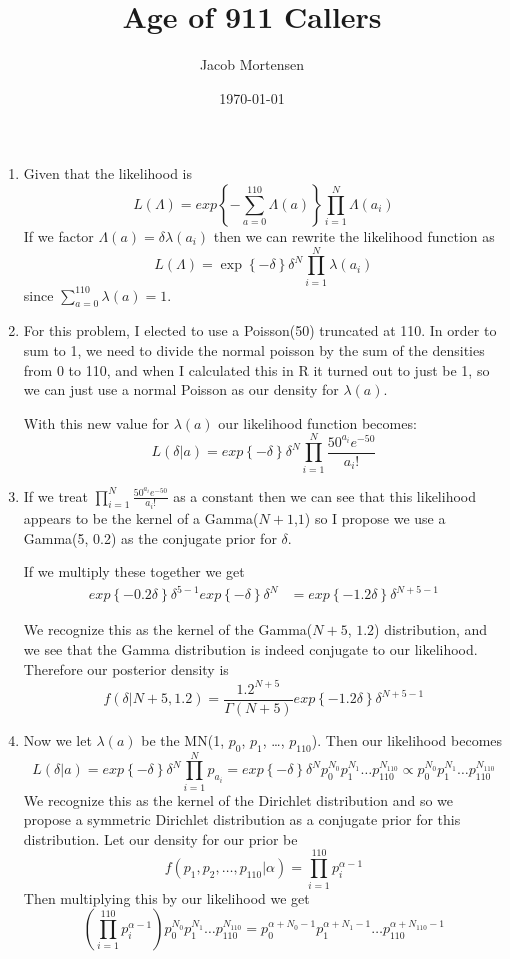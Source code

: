 \documentclass[12pt, oneside]{article}
\title{Age of 911 Callers}
\author{Jacob Mortensen}
\date{\today}
\begin{document}
\maketitle
\begin{enumerate}

\item Given that the likelihood is 
$$L(\Lambda) = exp\left\{-\sum_{a=0}^{110}\Lambda(a)\right\}\prod_{i=1}^{N}\Lambda(a_i)$$
If we factor $\Lambda(a) = \delta \lambda(a_i)$ then we can rewrite the likelihood function as
$$ L(\Lambda) = \exp\left\{-\delta\right\}\delta^N\prod_{i=1}^{N}\lambda(a_i)$$
since $\sum_{a=0}^{110}\lambda(a) = 1$.

\item For this problem, I elected to use a Poisson(50) truncated at 110. 
  In order to sum to 1, we need to divide the normal poisson by the sum of the densities 
  from 0 to 110, and when I calculated this in R it turned out to just be 1, so we can 
  just use a normal Poisson as our density for $\lambda(a)$.
 
  With this new value for $\lambda(a)$ our likelihood function becomes:
  $$ L(\delta | a) = exp\left\{-\delta\right\}\delta^N\prod_{i=1}^N\frac{50^{a_i}e^{-50}}{a_i!} $$

\item If we treat $\prod_{i=1}^N\frac{50^{a_i}e^{-50}}{a_i!}$ as a constant then we can see 
  that this likelihood appears to be the kernel of a Gamma($N+1$,$1$) so I propose we use a 
  Gamma(5, 0.2) as the conjugate prior for $\delta$.
 
  If we multiply these together we get 
  \begin{align*}
    exp\left\{-0.2\delta\right\}\delta^{5-1}exp\left\{-\delta\right\}\delta^N
    &= exp\left\{-1.2\delta\right\}\delta^{N+5-1}
  \end{align*}

  We recognize this as the kernel of the Gamma($N+5$, $1.2$) distribution,
  and we see that the Gamma distribution is indeed conjugate to our likelihood. 
  Therefore our posterior density is 
  $$ f(\delta | N+5, 1.2) = \frac{1.2^{N+5}}{\Gamma\left(N+5\right)}exp\left\{-1.2\delta\right\}\delta^{N+5-1} $$

\item Now we let $\lambda(a)$ be the MN(1, $p_0$, $p_1$, \dots, $p_{110}$). Then our likelihood 
  becomes 
  $$ L(\delta|a) = exp\left\{-\delta \right\} \delta^N \prod_{i=1}^N p_{a_i} 
    = exp\left\{-\delta \right\} \delta^N p_0^{N_0}p_1^{N_1}\dots p_{110}^{N_{110}} 
    \propto p_0^{N_0}p_1^{N_1}\dots p_{110}^{N_{110}}
  $$
  We recognize this as the kernel of the Dirichlet distribution and so we propose a 
  symmetric Dirichlet distribution as a conjugate prior for this distribution. Let our 
  density for our prior be 
  $$ f(p_1, p_2, \dots, p_{110} | \alpha) = \prod_{i=1}^{110} p_i^{\alpha-1} $$
  Then multiplying this by our likelihood we get 
  $$ \left(\prod_{i=1}^{110}p_i^{\alpha-1}\right) p_0^{N_0}p_1^{N_1}\dots p_{110}^{N_{110}} 
  = p_0^{\alpha+N_0-1}p_1^{\alpha+N_1-1}\dots p_{110}^{\alpha+N_{110}-1} $$


\end{enumerate}
\end{document}
